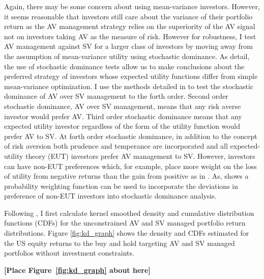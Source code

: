 Again, there may be some concern about using mean-variance investors. However, it seems reasonable that investors still care about the variance of their portfolio return as the AV management strategy relies on the superiority of the AV signal not on investors taking AV as the measure of risk. However for robustness, I test AV management against SV for a larger class of investors by moving away from the assumption of mean-variance utility using stochastic dominance. As \citet{hadar_rules_1969,hanoch_efficiency_1969,rothschild_increasing_1970,levy_experimental_2002} detail, the use of stochastic dominance tests allow us to make conclusions about the preferred strategy of investors whose expected utility functions differ from simple mean-variance optimization. I use the methods detailed in \citet{vinod_h.d._ranking_2004,vinod_hands-intermediate_2008} to test the stochastic dominance of AV over SV management to the forth order. Second order stochastic dominance, AV over SV management, means that any risk averse investor would prefer AV. \citep{mcfadden_testing_1989,valle_novel_2017} Third order stochastic dominance means that any expected utility investor regardless of the form of the utility function would prefer AV to SV. \citep{whitmore_third-degree_1970,chan_third_2016} At forth order stochastic dominance, in addition to the concept of risk aversion both prudence and temperance are incorporated and all expected-utility theory (EUT) investors prefer AV management to SV. \citep{kimball_standard_1993,noauthor_risk-aversion_nodate} However, investors can have non-EUT preferences which, for example, place more weight on the loss of utility from negative returns than the gain from positive as in \citet{kahneman_prospect_1979}. As, \citet{prelec_probability_1998} shows a probability weighting function can be used to incorporate the deviations in preference of non-EUT investors into stochastic dominance analysis.  

Following \citet{vinod_hands-intermediate_2008}, I first calculate kernel smoothed density and cumulative distribution functions (CDFs) for the unconstrained AV and SV managed portfolio return distributions. Figure \ref{fig:kd_graph} shows the density and CDFs estimated for the US equity returns to the buy and hold targeting AV and SV managed portfolios without investment constraints.
\bigskip
\centerline{\bf [Place Figure~\ref{fig:kd_graph} about here]}
\bigskip

